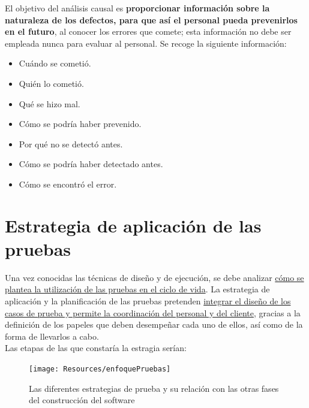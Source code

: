 El objetivo del análisis causal es \textbf{proporcionar información sobre la naturaleza de los defectos, para que así el personal pueda prevenirlos en el futuro}, al conocer los errores que comete; esta información no debe ser empleada nunca para evaluar al personal. Se recoge la siguiente información:
\begin{itemize}
    \item Cuándo se cometió.
    \item Quién lo cometió.
    \item Qué se hizo mal.
    \item Cómo se podría haber prevenido.
    \item Por qué no se detectó antes.
    \item Cómo se podría haber detectado antes.
    \item Cómo se encontró el error.
\end{itemize}


\section{Estrategia de aplicación de las pruebas}

Una vez conocidas las técnicas de diseño y de ejecución, se debe analizar \uline{cómo se plantea la utilización de las pruebas en el ciclo de vida}. La estrategia de aplicación y la planificación de las pruebas pretenden \uline{integrar el diseño de los casos de prueba y permite la coordinación del personal y del cliente}, gracias a la definición de los papeles que deben desempeñar cada uno de ellos, así como de la forma de llevarlos a cabo.\\

Las etapas de las que constaría la estragia serían:

\begin{figure}[H]
    \centering
    \texttt{[image: Resources/enfoquePruebas]}
    \caption{Las diferentes estrategias de prueba y su relación con las otras fases del construcción del software}
    \label{fig:estrategiasPruebas}
\end{figure}

